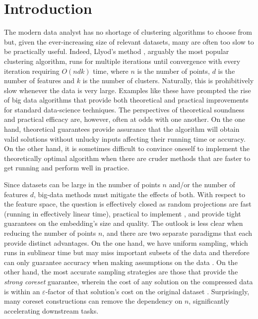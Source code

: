 \section{Introduction}

The modern data analyst has no shortage of clustering algorithms to choose from but, given the ever-increasing size of relevant datasets, many are often too
slow to be practically useful.  Indeed, Llyod's method \cite{Lloyd82}, arguably the most popular clustering algorithm, runs for multiple iterations until
convergence with every iteration requiring $O(ndk)$ time, where $n$ is the number of points, $d$ is the number of features and $k$ is the number of clusters.
Naturally, this is prohibitively slow whenever the data is very large. Examples like these have prompted the rise of big data algorithms that provide both
theoretical and practical improvements for standard data-science techniques. The perspectives of theoretical soundness and practical efficacy are, however,
often at odds with one another. On the one hand, theoretical guarantees provide assurance that the algorithm will obtain valid solutions without unlucky inputs
affecting their running time or accuracy. On the other hand, it is sometimes difficult to convince oneself to implement the theoretically optimal algorithm when
there are cruder methods that are faster to get running and perform well in practice.

Since datasets can be large in the number of points $n$ and/or the number of features $d$, big-data methods must mitigate the effects of both.  With respect to
the feature space, the question is effectively closed as random projections are fast (running in effectively linear time), practical to implement
\cite{makarychev2019performance}, and provide tight guarantees on the embedding's size and quality. The outlook is less clear when reducing the number of points
$n$, and there are two separate paradigms that each provide distinct advantages.  On the one hand, we have uniform sampling, which runs in sublinear time but
may miss important subsets of the data and therefore can only guarantee accuracy when making assumptions on the data \cite{HJJ23}.  On the other hand, the
most accurate sampling strategies are those that provide the \emph{strong coreset} guarantee, wherein the cost of any solution on the compressed data is within
an $\varepsilon$-factor of that solution's cost on the original dataset \cite{stoc21}.  Surprisingly, many coreset constructions can remove the dependency on
$n$, significantly accelerating downstream tasks.

